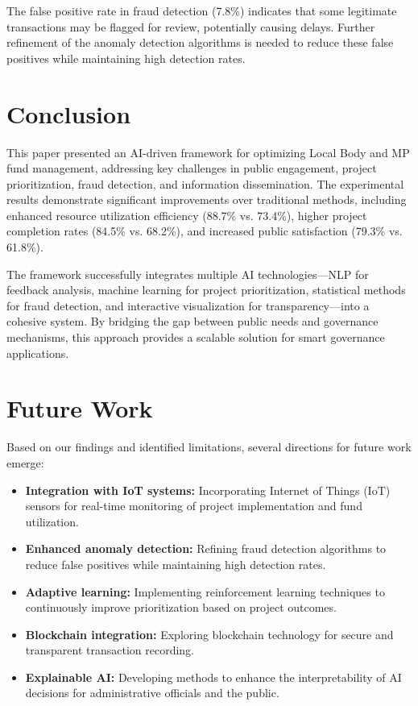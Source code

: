 \documentclass[12pt,a4paper]{report}
\begin{document}
\noindent The false positive rate in fraud detection (7.8\%) indicates that some legitimate transactions may be flagged for review, potentially causing delays. Further refinement of the anomaly detection algorithms is needed to reduce these false positives while maintaining high detection rates.



\chapter{Conclusion}
\indent \indent This paper presented an AI-driven framework for optimizing Local Body and MP fund management, addressing key challenges in public engagement, project prioritization, fraud detection, and information dissemination. The experimental results demonstrate significant improvements over traditional methods, including enhanced resource utilization efficiency (88.7\% vs. 73.4\%), higher project completion rates (84.5\% vs. 68.2\%), and increased public satisfaction (79.3\% vs. 61.8\%).

\noindent The framework successfully integrates multiple AI technologies—NLP for feedback analysis, machine learning for project prioritization, statistical methods for fraud detection, and interactive visualization for transparency—into a cohesive system. By bridging the gap between public needs and governance mechanisms, this approach provides a scalable solution for smart governance applications.

\chapter{Future Work}
\indent \indent Based on our findings and identified limitations, several directions for future work emerge:

\begin{itemize}
    \item \textbf{Integration with IoT systems:} Incorporating Internet of Things (IoT) sensors for real-time monitoring of project implementation and fund utilization.
    \item \textbf{Enhanced anomaly detection:} Refining fraud detection algorithms to reduce false positives while maintaining high detection rates.
    \item \textbf{Adaptive learning:} Implementing reinforcement learning techniques to continuously improve prioritization based on project outcomes.
    \item \textbf{Blockchain integration:} Exploring blockchain technology for secure and transparent transaction recording.
    \item \textbf{Explainable AI:} Developing methods to enhance the interpretability of AI decisions for administrative officials and the public.
\end{itemize}
\end{document}

